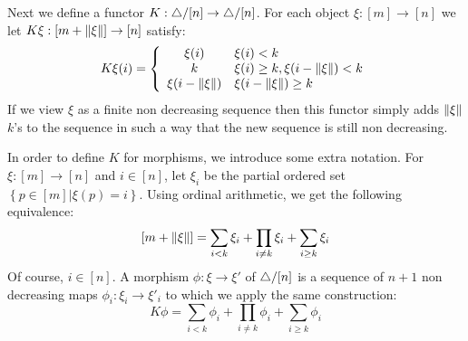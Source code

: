 \documentclass{amsart}
\theoremstyle{plain}
\theoremstyle{definition}
\newcommand\hide[1]{}
\newcommand\set[1]{\left\{#1\right\}}
\begin{document}
Next we define a functor $K:{\mathord{\triangle}}/[n]\to{\mathord{\triangle}}/[n]$. For each object $\xi:[m]\to[n]$ we let $K\xi:[m+\left\Vert\xi\right\Vert]\to[n]$ satisfy:
\[ K\xi(i) = \left\{ \begin{array}{cl} 
\xi(i) & \xi(i)<k\\
k & \xi(i)\geq k, \xi(i-\left\Vert\xi\right\Vert)<k\\
\xi(i-\left\Vert\xi\right\Vert) & \xi(i-\left\Vert\xi\right\Vert)\geq k
\end{array}\right.\]
If we view $\xi$ as a finite non decreasing sequence then this functor simply adds $\left\Vert\xi\right\Vert$ $k$'s to the sequence in such a way that the new sequence is still non decreasing.

\hide{Symmetrie in de definitie is wel leuk, maar splitsen maakt het product te klein.}
In order to define $K$ for morphisms, we introduce some extra notation. For $\xi:[m]\to[n]$ and $i\in[n]$, let $\xi_i$ be the partial ordered set $\set{p\in[m]|\xi(p)=i}$. Using ordinal arithmetic, we get the following equivalence:
\[ [m+\left\Vert\xi\right\Vert] = \sum_{i<k} \xi_i+\prod_{i\neq k}\xi_i+\sum_{i\geq k} \xi_i\]
Of course, $i\in[n]$. A morphism $\phi:\xi\to\xi'$ of ${\mathord{\triangle}}/[n]$ is a sequence of $n+1$ non decreasing maps $\phi_i:\xi_i\to\xi'_i$ to which we apply the same construction:
\[ K\phi = \sum_{i<k} \phi_i+\prod_{i\neq k}\phi_i+
\sum_{i\geq k} \phi_i \]
\end{document}
